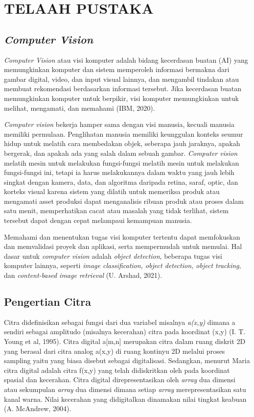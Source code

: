 \chapter{TELAAH PUSTAKA}
\label{cha:2-TelaahPustaka}

\vspace{1cm}
\section{\textit{Computer Vision}}
\hspace{1,2cm}\textit{Computer Vision} atau visi komputer adalah bidang kecerdasan buatan (AI) yang memungkinkan komputer dan sistem memperoleh informasi bermakna dari gambar digital, video, dan input visual lainnya, dan mengambil tindakan atau membuat rekomendasi berdasarkan informasi tersebut. Jika kecerdasan buatan memungkinkan komputer untuk berpikir, visi komputer memungkinkan untuk melihat, mengamati, dan memahami (IBM, 2020).

\textit{Computer vision} bekerja hamper sama dengan visi manusia, kecuali manusia memiliki permulaan. Penglihatan manusia memiliki keunggulan konteks seumur hidup untuk melatih cara membedakan objek, seberapa jauh jaraknya, apakah bergerak, dan apakah ada yang salah dalam sebuah gambar. \textit{Computer vision} melatih mesin untuk melakukan fungsi-fungsi melatih mesin untuk melakukan fungsi-fungsi ini, tetapi ia harus melakukannya dalam waktu yang jauh lebih singkat dengan kamera, data, dan algoritma daripada retina, saraf, optic, dan korteks visual karena sistem yang dilatih untuk memeriksa produk atau mengamati asset produksi dapat menganalisis ribuan produk atau proses dalam satu menit, memperhatikan cacat atau masalah yang tidak terlihat, sistem tersebut dapat dengan cepat melampaui kemampuan manusia. 

Memahami dan menentukan tugas visi komputer tertentu dapat memfokuskan dan memvalidasi proyek dan aplikasi, serta mempermudah untuk memulai. Hal dasar untuk \textit{computer vision} adalah \textit{object detection}, beberapa tugas visi komputer lainnya, seperti \textit{image classification, object detection, object tracking}, dan \textit{content-based image retrieval} (U. Arshad, 2021).

\vspace{1cm}
\section{Pengertian Citra}
Citra didefinisikan sebagai fungsi dari dua variabel misalnya \textit{a(x,y)} dimana a sendiri sebagai amplitudo (misalnya kecerahan) citra pada koordinat (x,y) (I. T. Young et al, 1995). Citra digital a[m,n] merupakan citra dalam ruang diskrit 2D yang berasal dari citra analog a(x,y) di ruang kontinyu 2D melalui proses sampling yaitu yang biasa disebut sebagai digitalisasi. Sedangkan, menurut Maria citra digital adalah citra f(x,y) yang telah didiskritkan oleh pada koordinat spasial dan kecerahan. Citra digital direpresentasikan oleh \textit{array} dua dimensi atau sekumpulan \textit{array} dua dimensi dimana setiap \textit{array} merepresentasikan satu kanal warna. Nilai kecerahan yang didigitalkan dinamakan nilai tingkat keabuan (A. McAndrew, 2004).

